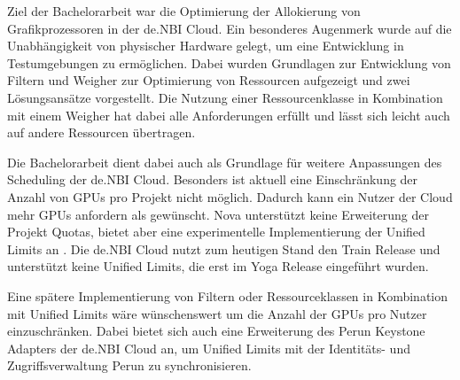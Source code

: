 \documentclass[../Main.tex]{subfiles}
\begin{document}
Ziel der Bachelorarbeit war die Optimierung der Allokierung von Grafikprozessoren in der de.NBI Cloud.
Ein besonderes Augenmerk wurde auf die Unabhängigkeit von physischer Hardware gelegt, um
eine Entwicklung in Testumgebungen zu ermöglichen.
Dabei wurden Grundlagen zur Entwicklung von Filtern und Weigher zur Optimierung
von Ressourcen aufgezeigt und zwei Lösungsansätze vorgestellt.
Die Nutzung einer Ressourcenklasse in Kombination mit einem Weigher hat dabei alle Anforderungen
erfüllt und lässt sich leicht auch auf andere Ressourcen übertragen.

Die Bachelorarbeit dient dabei auch als Grundlage für weitere Anpassungen des Scheduling der de.NBI Cloud.
Besonders ist aktuell eine Einschränkung der Anzahl von GPUs pro Projekt nicht möglich. Dadurch kann ein
Nutzer der Cloud mehr GPUs anfordern als gewünscht. Nova unterstützt keine Erweiterung der Projekt Quotas,
bietet aber eine experimentelle Implementierung der Unified Limits an \citep{UnifiedLimits}. Die de.NBI Cloud
nutzt zum heutigen Stand den Train Release und unterstützt keine Unified Limits, die erst im Yoga Release eingeführt wurden.

Eine spätere Implementierung von Filtern oder Ressourceklassen in Kombination mit Unified Limits
wäre wünschenswert um die Anzahl der GPUs pro Nutzer einzuschränken. Dabei bietet sich auch eine Erweiterung
des Perun Keystone Adapters der de.NBI Cloud an, um Unified Limits mit der Identitäts- und Zugriffsverwaltung
Perun zu synchronisieren.

\biblio %
\end{document}
